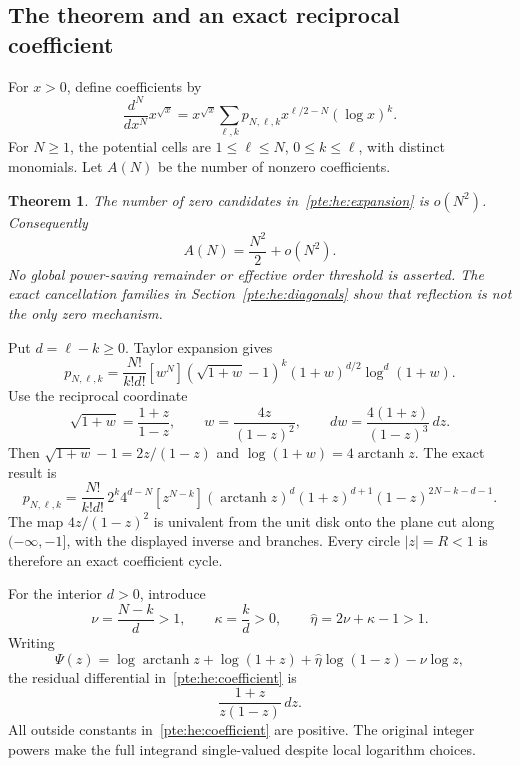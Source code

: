 \documentclass[11pt,a4paper]{article}
\numberwithin{equation}{section}
\newtheorem{theorem}{Theorem}[section]
\theoremstyle{definition}
\theoremstyle{plain}
\begin{document}
\subsection{The theorem and an exact reciprocal coefficient}
For $x>0$, define coefficients by
\begin{equation}\label{pte:he:expansion}
 \frac{d^N}{dx^N}x^{\sqrt{x}}
 =x^{\sqrt{x}}\sum_{\ell,k}p_{N,\ell,k}
             x^{\ell/2-N}(\log x)^k.
\end{equation}
For $N\ge1$, the potential cells are $1\le\ell\le N$, $0\le k\le\ell$, with distinct monomials. Let $A(N)$ be the number of nonzero coefficients.

\begin{theorem}\label{pte:he:main}
The number of zero candidates in~\eqref{pte:he:expansion} is $o(N^2)$. Consequently
\[
 A(N)=\frac{N^2}{2}+o(N^2).
\]
No global power-saving remainder or effective order threshold is asserted. The exact cancellation families in Section~\ref{pte:he:diagonals} show that reflection is not the only zero mechanism.
\end{theorem}

Put $d=\ell-k\ge0$. Taylor expansion gives
\begin{equation}\label{pte:he:taylor}
 p_{N,\ell,k}=\frac{N!}{k!d!}[w^N]
 (\sqrt{1+w}-1)^k(1+w)^{d/2}\log^d(1+w).
\end{equation}
Use the reciprocal coordinate
\[
 \sqrt{1+w}=\frac{1+z}{1-z},\qquad
 w=\frac{4z}{(1-z)^2},\qquad
 dw=\frac{4(1+z)}{(1-z)^3}\,dz.
\]
Then $\sqrt{1+w}-1=2z/(1-z)$ and $\log(1+w)=4\operatorname{arctanh}z$. The exact result is
\begin{equation}\label{pte:he:coefficient}
 p_{N,\ell,k}=\frac{N!}{k!d!}\,2^k4^{d-N}
 [z^{N-k}](\operatorname{arctanh}z)^d
 (1+z)^{d+1}(1-z)^{2N-k-d-1}.
\end{equation}
The map $4z/(1-z)^2$ is univalent from the unit disk onto the plane cut along $(-\infty,-1]$, with the displayed inverse and branches. Every circle $|z|=R<1$ is therefore an exact coefficient cycle.

For the interior $d>0$, introduce
\begin{equation}\label{pte:he:ratios}
 \nu=\frac{N-k}{d}>1,\qquad \kappa=\frac{k}{d}>0,\qquad
 \hat\eta=2\nu+\kappa-1>1.
\end{equation}
Writing
\begin{equation}\label{pte:he:Psi}
 \Psi(z)=\log\operatorname{arctanh}z+\log(1+z)
                  +\hat\eta\log(1-z)-\nu\log z,
\end{equation}
the residual differential in~\eqref{pte:he:coefficient} is
\begin{equation}\label{pte:he:differential}
 \frac{1+z}{z(1-z)}\,dz.
\end{equation}
All outside constants in~\eqref{pte:he:coefficient} are positive. The original integer powers make the full integrand single-valued despite local logarithm choices.
\end{document}
